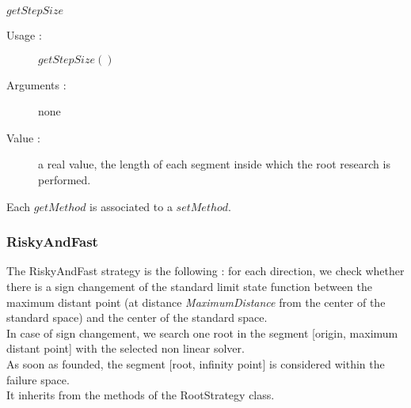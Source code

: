 \begin{description}
\begin{description}
\begin{description}
    \end{description}
    \bigskip
  \item $getStepSize$
    \begin{description}
    \item[Usage :] $getStepSize()$
    \item[Arguments :] none
    \item[Value :] a real value, the length of each segment inside which the root research is performed.
    \end{description}
  \end{description}

  Each $getMethod$  is associated to a $setMethod$.
\end{description}


\newpage \subsubsection{RiskyAndFast}

The RiskyAndFast strategy is the following : for each direction, we check whether there is a sign changement of the standard limit state function between the maximum distant point (at distance {\itshape MaximumDistance} from the center of the standard space) and the center of the standard space. \\
In case of sign changement, we search one root in the segment [origin, maximum distant point] with the selected non linear solver.\\
As soon as founded, the segment [root, infinity point] is considered within the failure space.\\

It inherits from the methods of the RootStrategy class.

